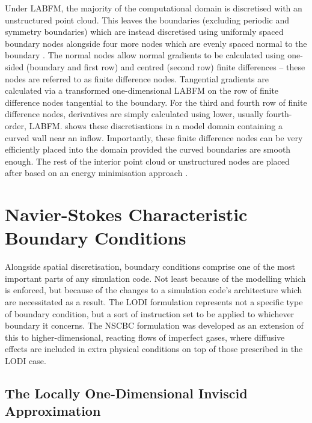 Under LABFM, the majority of the computational domain is discretised with an unstructured point cloud. This leaves the boundaries (excluding periodic and symmetry boundaries) which are instead discretised using uniformly spaced boundary nodes alongside four more nodes which are evenly spaced normal to the boundary \cite{king2022HighOrderSimulationsIsothermal}. The normal nodes allow normal gradients to be calculated using one-sided (boundary and first row) and centred (second row) finite differences -- these nodes are referred to as finite difference nodes. Tangential gradients are calculated via a transformed one-dimensional LABFM on the row of finite difference nodes tangential to the boundary. For the third and fourth row of finite difference nodes, derivatives are simply calculated using lower, usually fourth-order, LABFM.  shows these discretisations in a model domain containing a curved wall near an inflow. Importantly, these finite difference nodes can be very efficiently placed into the domain provided the curved boundaries are smooth enough. The rest of the interior point cloud or unstructured nodes are placed after based on an energy minimisation approach \cite{king2020HighOrderDifference}.





\section{Navier-Stokes Characteristic Boundary Conditions} \label{sec:NSCBC}

Alongside spatial discretisation, boundary conditions comprise one of the most important parts of any simulation code. Not least because of the modelling which is enforced, but because of the changes to a simulation code's architecture which are necessitated as a result. The LODI formulation \cite{thompson1987TimeDependentBoundary,thompson1987LecturesSeriesComputational,thompson1990TimeDependentBoundaryConditions} represents not a specific type of boundary condition, but a sort of instruction set to be applied to whichever boundary it concerns. The NSCBC formulation \cite{poinsot1992BoundaryConditionsDirect,poinsot2001TheoreticalNumericalCombustion} was developed as an extension of this to higher-dimensional, reacting flows of imperfect gases, where diffusive effects are included in extra physical conditions on top of those prescribed in the LODI case.


\subsection{The Locally One-Dimensional Inviscid Approximation} \label{sec:LODI}

